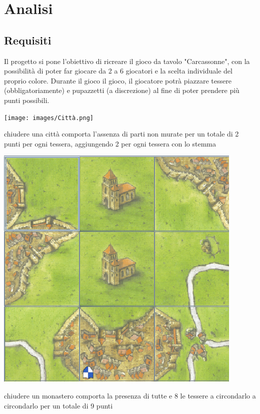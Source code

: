 \section{Analisi}
\subsection{Requisiti}
Il progetto si pone l'obiettivo di ricreare il gioco da tavolo "Carcassonne", con la possibilità di poter far giocare da 2 a 6 giocatori e la scelta individuale del proprio colore. Durante il gioco il gioco, il giocatore potrà piazzare tessere (obbligatoriamente) e pupazzetti (a discrezione) al fine di poter prendere più punti possibili.

\vfill

        {\texttt{[image: images/Città.png]}}

\vfill

chiudere una città comporta l’assenza di parti non murate per un totale di 2 punti per ogni tessera, aggiungendo 2 per ogni tessera con lo stemma

\vfill

        {\includegraphics[scale=.42]{images/Monastero.png}}

\vfill

chiudere un monastero comporta la presenza di tutte e 8 le tessere a circondarlo a circondarlo per un totale di 9 punti

\vfill

